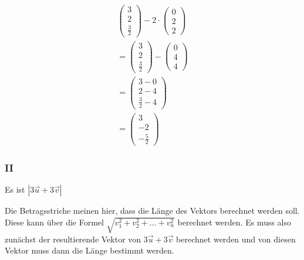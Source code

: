 \begin{align*}
    \begin{pmatrix}
        3 \\ 2 \\ \frac{3}{2}
    \end{pmatrix} - 2 \cdot \begin{pmatrix}
        0 \\ 2 \\ 2
    \end{pmatrix} \\
    = \begin{pmatrix}
        3 \\ 2 \\ \frac{3}{2}
    \end{pmatrix} - \begin{pmatrix}
        0 \\ 4 \\ 4
    \end{pmatrix} \\
    = \begin{pmatrix}
        3 - 0\\ 2 - 4 \\ \frac{3}{2} - 4
    \end{pmatrix} \\
    = \begin{pmatrix}
        3 \\ -2 \\ -\frac{5}{2}
    \end{pmatrix}
\end{align*}

\subsubsection{II}
Es ist $\left|3\vec{u} + 3\vec{v}\right|$

Die Betragsstriche meinen hier, dass die Länge des Vektors berechnet werden soll. 
Diese kann über die Formel $\sqrt{v_1^2 + v_2^2 + \dots + v_n^2}$ berechnet werden.
Es muss also zunächst der resultierende Vektor von $3\vec{u} + 3\vec{v}$ berechnet werden und 
von diesen Vektor muss dann die Länge bestimmt werden.


